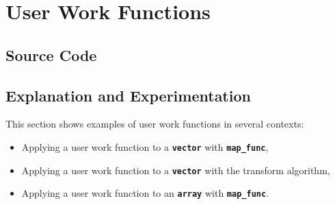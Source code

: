 \documentclass{report}
\begin{document}

\pagebreak
\section{User Work Functions}

\subsection{Source Code}



\subsection{Explanation and Experimentation}

This section shows examples of user work functions in several contexts:
\begin{itemize}
\item
Applying a user work function to a
\texttt{{\bf vector}} with
\texttt{{\bf map\_func}},
\item
Applying a user work function to a
\texttt{{\bf vector}}
with the transform algorithm,
\item
Applying a user work function to an
\texttt{{\bf array}}
with
\texttt{{\bf map\_func}}.
\end{itemize}
\end{document}
